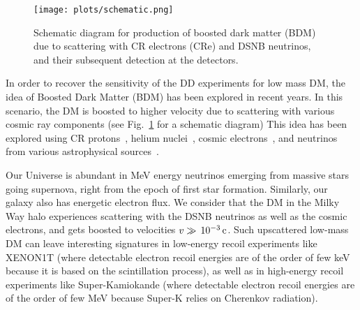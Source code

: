 \documentclass[11pt,prd,twocolumn,nofootinbib,reprint,superscriptaddress,longbibliography,colorlinks=true,citecolor=blue]{revtex4-1}
\begin{document}
\begin{figure}
\centering
\texttt{[image: plots/schematic.png]}
\caption{Schematic diagram for production of boosted dark matter (BDM) due to scattering with CR electrons (CRe) and DSNB neutrinos, and their subsequent detection at the detectors.}
\protect\label{Fig:schematic}
\end{figure}

In order to recover the sensitivity of the DD experiments for low mass DM, the idea of Boosted Dark Matter (BDM) has been explored in recent years.
In this scenario, the DM is boosted to higher velocity due to scattering with various cosmic ray components (see  Fig.~\ref{Fig:schematic} for a schematic diagram)
This idea has been explored using CR protons~\cite{Bringmann:2018cvk,Cappiello:2018hsu,Cappiello:2019qsw}, helium nuclei~\cite{Bringmann:2018cvk}, 
cosmic electrons~\cite{Ema:2018bih,Cappiello:2018hsu,Cappiello:2019qsw,Dent:2020syp,Jho:2020sku,Bramante:2021dyx}, and neutrinos from various astrophysical sources~\cite{Farzan:2014gza,Arguelles:2017atb,Yin:2018yjn,Jho:2021rmn,Das:2021lcr}. 

Our Universe is abundant in MeV energy neutrinos emerging from massive stars going supernova, right from the epoch of first star formation.
Similarly, our galaxy also has energetic electron flux. We consider  that the DM in the Milky Way halo experiences scattering with the DSNB neutrinos as well as the cosmic electrons, and gets boosted to velocities $v\gg\,10^{-3}\,{\rm c}$. Such upscattered low-mass DM can leave interesting signatures in low-energy recoil experiments like XENON1T (where detectable electron recoil energies are of the order of few keV because it is based on the scintillation process), as well as in high-energy recoil experiments like Super-Kamiokande (where detectable electron recoil energies are of the order of few MeV because Super-K relies on Cherenkov radiation). %
\end{document}
